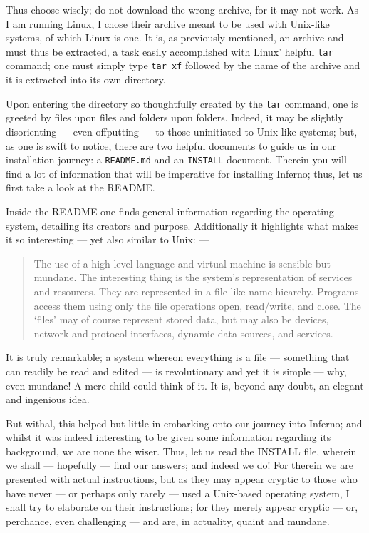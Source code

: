 \documentclass[a5paper,twoside,12pt]{report}
\begin{document}
Thus choose wisely; do not download the wrong archive, for it may not work. As I am running Linux, I chose their archive meant to be used with Unix-like systems, of which Linux is one. It is, as previously mentioned, an archive and must thus be extracted, a task easily accomplished with Linux' helpful \texttt{tar} command; one must simply type \texttt{tar xf} followed by the name of the archive and it is extracted into its own directory.

Upon entering the directory so thoughtfully created by the \texttt{tar} command, one is greeted by files upon files and folders upon folders. Indeed, it may be slightly disorienting — even offputting — to those uninitiated to Unix-like systems; but, as one is swift to notice, there are two helpful documents to guide us in our installation journey: a \texttt{README.md} and an \texttt{INSTALL} document. Therein you will find a lot of information that will be imperative for installing Inferno; thus, let us first take a look at the README.

Inside the README one finds general information regarding the operating system, detailing its creators and purpose. Additionally it highlights what makes it so interesting — yet also similar to Unix: —

\begin{quote}
  The use of a high-level language and virtual machine is sensible but mundane. The interesting thing is the
  system’s representation of services and resources. They are represented in a file-like name hiearchy.
  Programs access them using only the file operations open, read/write, and close. The ‘files’ may of course
  represent stored data, but may also be devices, network and protocol interfaces, dynamic data sources, and
  services.
\end{quote}

It is truly remarkable; a system whereon everything is a file — something that can readily be read and edited — is revolutionary and yet it is simple — why, even mundane! A mere child could think of it. It is, beyond any doubt, an elegant and ingenious idea.

But withal, this helped but little in embarking onto our journey into Inferno; and whilst it was indeed interesting to be given some information regarding its background, we are none the wiser. Thus, let us read the INSTALL file, wherein we shall — hopefully — find our answers; and indeed we do!
For therein we are presented with actual instructions, but as they may appear cryptic to those who have never — or perhaps only rarely — used a Unix-based operating system, I shall try to elaborate on their instructions; for they merely appear cryptic — or, perchance, even challenging — and are, in actuality, quaint and mundane.
\end{document}
